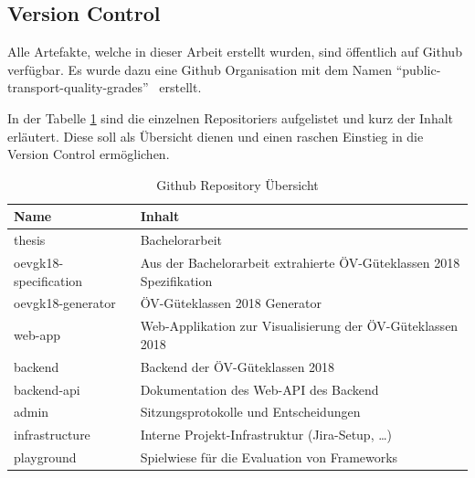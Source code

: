 \subsection{Version Control}
\label{Infrastruktur:Version Control}

Alle Artefakte, welche in dieser Arbeit erstellt wurden, sind öffentlich auf Github verfügbar.
Es wurde dazu eine Github Organisation mit dem Namen "`public-transport-quality-grades"'~\cite{github} erstellt.

In der Tabelle \ref{table:github_overview} sind die einzelnen Repositoriers aufgelistet und kurz der Inhalt erläutert.
Diese soll als Übersicht dienen und einen raschen Einstieg in die Version Control ermöglichen.

\begin{table}[H]
    \begin{tabular}{l p{10.6cm}}
        \toprule
        \textbf{Name}           & \textbf{Inhalt}\\
        \midrule
        thesis~\cite{github:thesis}
                                & Bachelorarbeit\\
        oevgk18-specification~\cite{github:oevgk18-specification}
                                & Aus der Bachelorarbeit extrahierte \acs{ÖV}-Güteklassen 2018 Spezifikation\\
        oevgk18-generator~\cite{github:oevgk18-generator}
                                & \acs{ÖV}-Güteklassen 2018 Generator\\
        web-app~\cite{github:web-app}
                                & Web-Applikation zur Visualisierung der \acs{ÖV}-Güteklassen 2018\\
        backend~\cite{github:backend}
                                & Backend der \acs{ÖV}-Güteklassen 2018\\
        backend-api~\cite{github:backend-api}
                                & Dokumentation des Web-\acs{API} des Backend\\
        admin~\cite{github:admin}
                                & Sitzungsprotokolle und Entscheidungen\\
        infrastructure~\cite{github:infrastructure}
                                & Interne Projekt-Infrastruktur (Jira-Setup, \dots)\\  
        playground~\cite{github:playground}
                                & Spielwiese für die Evaluation von Frameworks\\
                                
        \bottomrule
    \end{tabular}
    \caption{Github Repository Übersicht}
    \label{table:github_overview}
\end{table}